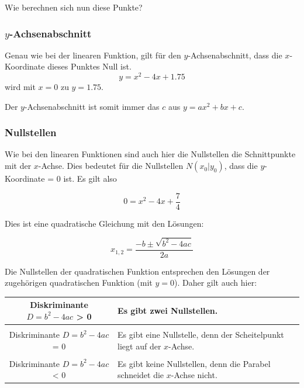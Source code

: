 Wie berechnen sich nun diese Punkte?
\newpage


\subsubsection{$y$-Achsenabschnitt}
Genau wie bei der linearen Funktion, gilt für den $y$-Achsenabschnitt,
dass die $x$-Koordinate dieses Punktes Null ist.
$$y = x^2 -4x + 1.75$$
wird mit $x=0$ zu
$y = 1.75$.

Der $y$-Achsenabschnitt ist somit immer das $c$ aus $y = ax^2 + bx +
c$.

\subsubsection{Nullstellen}
Wie bei den linearen Funktionen sind auch hier die
Nullstellen die Schnittpunkte mit der $x$-Achse. Dies bedeutet für die
Nullstellen $N(x_0 | y_0)$, dass die $y$-Koordinate = 0 ist. Es gilt
also

$$0 = x^2 - 4 x + \frac{7}{4} $$

Dies ist eine quadratische Gleichung mit den Lösungen:

$$x_{1,2} = \frac{-b \pm \sqrt{b^2-4ac}}{2a}$$ 


\begin{bemerkung}{}{}
  Die Nullstellen der quadratischen Funktion entsprechen den Lösungen
  der zugehörigen quadratischen Funktion (mit $y=0$). Daher gilt
  auch hier: 


  \begin{tabular}{c|p{8cm}}
    Diskriminante $D=b^2-4ac$ > 0 & Es gibt zwei Nullstellen. \\
    \hline\\
    Diskriminante $D=b^2-4ac$ = 0 & Es gibt eine Nullstelle, denn der Scheitelpunkt liegt auf der $x$-Achse.\\
    \hline\\
    Diskriminante $D=b^2-4ac$ < 0 & Es gibt keine Nullstellen, denn die Parabel schneidet die $x$-Achse nicht.\\
  \end{tabular}
  
 \fi{} 
\end{bemerkung}
\newpage



